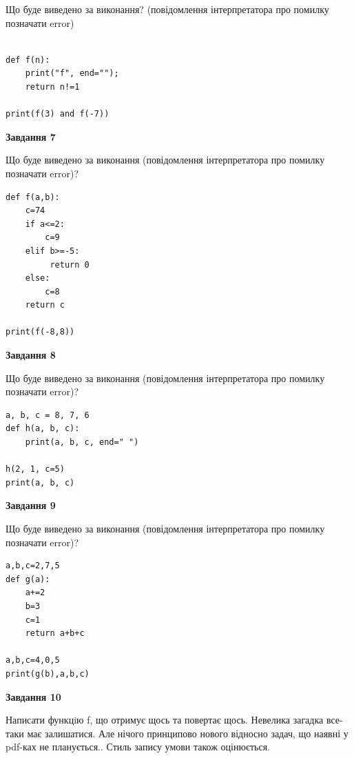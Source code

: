 \documentclass[12pt, ukrainian]{article}
\begin{document}
{\begin {large}
Що буде виведено за виконання? (повідомлення інтерпретатора про помилку позначати error)\par
\begin{verbatim}

def f(n):
    print("f", end="");
    return n!=1

print(f(3) and f(-7))
\end{verbatim}

{\begin {center}\textbf{Завдання 7}\end {center}}

Що буде виведено за виконання (повідомлення інтерпретатора про помилку позначати error)?\par
\begin{verbatim}
def f(a,b):
    c=74
    if a<=2:
        c=9
    elif b>=-5:
         return 0
    else: 
        c=8
    return c

print(f(-8,8))
\end{verbatim}

{\begin {center}\textbf{Завдання 8}\end {center}}

Що буде виведено за виконання (повідомлення інтерпретатора про помилку позначати error)?\par
\begin{verbatim}
a, b, c = 8, 7, 6
def h(a, b, c):
    print(a, b, c, end=" ")

h(2, 1, c=5)
print(a, b, c)
\end{verbatim}

{\begin {center}\textbf{Завдання 9}\end {center}}

Що буде виведено за виконання (повідомлення інтерпретатора про помилку позначати error)?\par
\begin{verbatim}
a,b,c=2,7,5
def g(a):
    a+=2
    b=3
    c=1
    return a+b+c

a,b,c=4,0,5
print(g(b),a,b,c)
\end{verbatim}

{\begin {center}\textbf{Завдання 10}\end {center}}


Написати функцiю f, що отримує щось та повертає щось. Невелика загадка все-таки має залишатися. Але нічого принципово нового відносно задач, що наявні у pdf-ках не планується.. Стиль запису умови також оцінюється.\par
\end {large}}
\newpage
\end{document}
